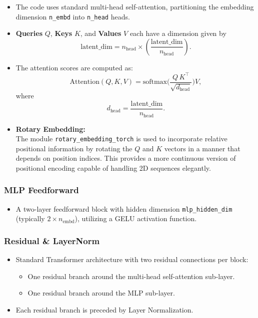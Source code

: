 \documentclass[11pt]{article}
\begin{document}
\begin{itemize}
  \item The code uses standard multi-head self-attention, partitioning the embedding dimension \texttt{n\_embd} into \texttt{n\_head} heads.
  \item \textbf{Queries} \( Q \), \textbf{Keys} \( K \), and \textbf{Values} \( V \) each have a dimension given by
    \[
    \text{latent\_dim} = n_{\text{head}} \times \left(\frac{\text{latent\_dim}}{n_{\text{head}}}\right).
    \]
  \item The attention scores are computed as:
    \[
    \text{Attention}(Q, K, V) = \text{softmax}\!\Biggl(\frac{Q\,K^\top}{\sqrt{d_{\text{head}}}}\Biggr)V,
    \]
    where
    \[
    d_{\text{head}} = \frac{\text{latent\_dim}}{n_{\text{head}}}.
    \]
  \item \textbf{Rotary Embedding:} \\
    The module \texttt{rotary\_embedding\_torch} is used to incorporate relative positional information by rotating the \( Q \) and \( K \) vectors in a manner that depends on position indices. This provides a more continuous version of positional encoding capable of handling 2D sequences elegantly.
\end{itemize}

\subsubsection*{MLP Feedforward}

\begin{itemize}
  \item A two-layer feedforward block with hidden dimension \texttt{mlp\_hidden\_dim} (typically \(2 \times n_{\text{embd}}\)), utilizing a GELU activation function.
\end{itemize}

\subsubsection*{Residual \& LayerNorm}

\begin{itemize}
  \item Standard Transformer architecture with two residual connections per block:
    \begin{itemize}
      \item One residual branch around the multi-head self-attention sub-layer.
      \item One residual branch around the MLP sub-layer.
    \end{itemize}
  \item Each residual branch is preceded by Layer Normalization.
\end{itemize}
\end{document}

